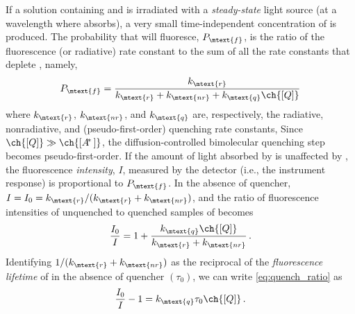 \documentclass[nobib,nofonts,nols,nohyper]{tufte-handout}
\begin{document}
If a solution containing  and  is irradiated with a \emph{steady-state} light source (at a wavelength where  absorbs), a very small time-independent concentration of  is produced. 
The probability that  will fluoresce, \( P_\mtext{f} \), is the ratio of the fluorescence (or radiative) rate constant to the sum of all the rate constants that deplete , namely,
\begin{equation}
	P_\mtext{f} = \frac{k_\mtext{r}}{k_\mtext{r} + k_\mtext{nr} + k_\mtext{q} \ch{[Q]}}
	\label{eq:prob_fluor}
\end{equation}
where \( k_\mtext{r} \), \( k_\mtext{nr} \), and \( k_\mtext{q} \)\ch{[Q]} are, respectively, the radiative, nonradiative, and (pseudo-first-order) quenching rate constants, 
Since \( \ch{[Q]} \gg \ch{[A\!^*\,]}\), the diffusion-controlled bimolecular quenching step becomes pseudo-first-order. 
If the amount of light absorbed by  is unaffected by \ch{[Q]}, the fluorescence \emph{intensity}, \( I \), measured by the detector (i.e., the instrument response) is proportional to \( P_\mtext{f} \). 
In the absence of quencher, \( I = I_0 = k_\mtext{r} / (k_\mtext{r} + k_\mtext{nr}) \), and the ratio of fluorescence intensities of unquenched to quenched samples of  becomes 
\begin{equation}
	\frac{I_0}{I} = 1 + \frac{k_\mtext{q} \ch{[Q]}}{k_\mtext{r} + k_\mtext{nr}} \, .
	\label{eq:quench_ratio}
\end{equation}
Identifying \( 1/(k_\mtext{r} + k_\mtext{nr}) \) as the reciprocal of the \emph{fluorescence lifetime} of  in the absence of quencher \( (\tau_0) \), we can write \cref{eq:quench_ratio} as 
\begin{equation}
	\frac{I_0}{I} - 1 = k_\mtext{q} \tau_0 \ch{[Q]} \, .
	\label{eq:sv_rel}
\end{equation}
\end{document}
